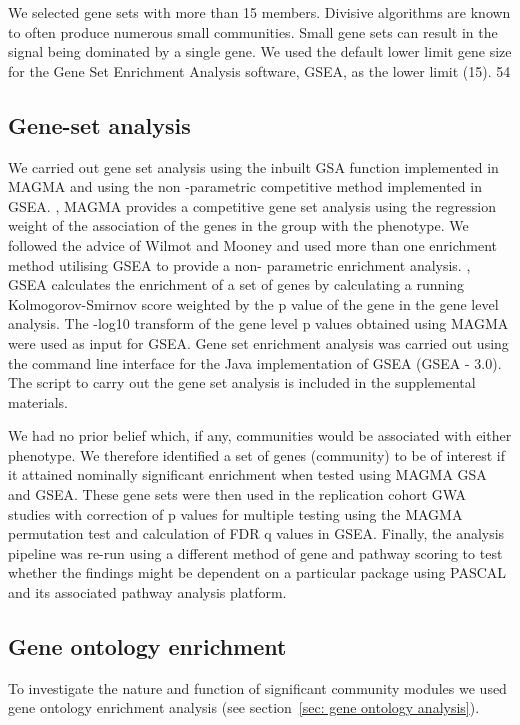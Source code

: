 We selected gene sets with more than 15 members. Divisive algorithms are known to often produce numerous small communities. Small gene sets can result in the signal being dominated by a single gene. We used the default lower limit gene size for the Gene Set Enrichment Analysis software, GSEA, as the lower limit (15). 54  

\subsection{Gene-set analysis}

We carried out gene set analysis using the inbuilt GSA function implemented in MAGMA and using the non -parametric competitive method implemented in GSEA. \cite{de2015magma},\cite{subramanian2005gene}  MAGMA provides a competitive gene set analysis using the regression weight of the association of the genes in the group with the phenotype. \cite{de2015magma}  We followed the advice of Wilmot and Mooney and used more than one enrichment method utilising GSEA to provide a non- parametric enrichment analysis. \cite{subramanian2005gene},\cite{mooney2015gene}  GSEA calculates the enrichment of a set of genes by calculating a running Kolmogorov-Smirnov score weighted by the p value of the gene in the gene level analysis. The -log10 transform of the gene level p values obtained using MAGMA were used as input for GSEA. Gene set enrichment analysis was carried out using the command line interface for the Java implementation of GSEA (GSEA - 3.0). The script to carry out the gene set analysis is included in the supplemental materials. 

We had no prior belief which, if any, communities would be associated with either phenotype. We therefore identified a set of genes (community) to be of interest if it attained nominally significant enrichment when tested using MAGMA GSA and GSEA. These gene sets were then used in the replication cohort GWA studies with correction of p values for multiple testing using the MAGMA permutation test and calculation of FDR q values in GSEA. Finally, the analysis pipeline was re-run using a different method of gene
and pathway scoring to test whether the findings might be dependent on a particular package using PASCAL and its associated pathway analysis platform. \cite{lamparter2016fast}  

\subsection{Gene ontology enrichment}
To investigate the nature and function of significant community modules we used gene ontology enrichment analysis (see section~\ref{sec: gene ontology analysis}). \cite{mi2013large}  

